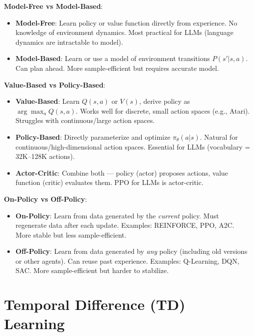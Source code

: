 \begin{keybox}
\textbf{Model-Free vs Model-Based}:

\begin{itemize}
  \item \textbf{Model-Free}: Learn policy or value function directly from experience. No knowledge of environment dynamics. Most practical for LLMs (language dynamics are intractable to model).
  \item \textbf{Model-Based}: Learn or use a model of environment transitions $P(s'|s,a)$. Can plan ahead. More sample-efficient but requires accurate model.
\end{itemize}

\textbf{Value-Based vs Policy-Based}:

\begin{itemize}
  \item \textbf{Value-Based}: Learn $Q(s,a)$ or $V(s)$, derive policy as $\arg\max_a Q(s,a)$. Works well for discrete, small action spaces (e.g., Atari). Struggles with continuous/large action spaces.
  \item \textbf{Policy-Based}: Directly parameterize and optimize $\pi_\theta(a|s)$. Natural for continuous/high-dimensional action spaces. Essential for LLMs (vocabulary = 32K--128K actions).
  \item \textbf{Actor-Critic}: Combine both --- policy (actor) proposes actions, value function (critic) evaluates them. PPO for LLMs is actor-critic.
\end{itemize}

\textbf{On-Policy vs Off-Policy}:

\begin{itemize}
  \item \textbf{On-Policy}: Learn from data generated by the \emph{current} policy. Must regenerate data after each update. Examples: REINFORCE, PPO, A2C. More stable but less sample-efficient.
  \item \textbf{Off-Policy}: Learn from data generated by \emph{any} policy (including old versions or other agents). Can reuse past experience. Examples: Q-Learning, DQN, SAC. More sample-efficient but harder to stabilize.
\end{itemize}
\end{keybox}

\section{Temporal Difference (TD) Learning}
\label{temporal-difference-td-learning}

